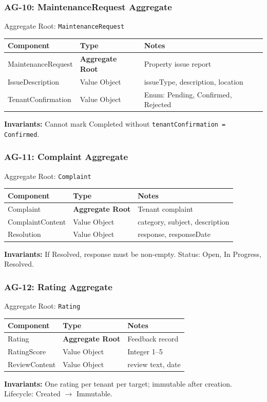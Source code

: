 \documentclass[12pt,a4paper]{article}
\begin{document}
\subsubsection{AG-10: MaintenanceRequest Aggregate}

\begin{infobox}{Aggregate Root: \texttt{MaintenanceRequest}}
\begin{tabular}{@{}p{3cm}p{2.8cm}p{7.8cm}@{}}
\textbf{Component} & \textbf{Type} & \textbf{Notes} \\
\hline
MaintenanceRequest & \textbf{Aggregate Root} & Property issue report \\
IssueDescription & Value Object & issueType, description, location \\
TenantConfirmation & Value Object & Enum: Pending, Confirmed, Rejected \\
\end{tabular}

\textbf{Invariants:} Cannot mark Completed without \texttt{tenantConfirmation = Confirmed}.
\end{infobox}

\subsubsection{AG-11: Complaint Aggregate}

\begin{infobox}{Aggregate Root: \texttt{Complaint}}
\begin{tabular}{@{}p{3cm}p{2.8cm}p{7.8cm}@{}}
\textbf{Component} & \textbf{Type} & \textbf{Notes} \\
\hline
Complaint & \textbf{Aggregate Root} & Tenant complaint \\
ComplaintContent & Value Object & category, subject, description \\
Resolution & Value Object & response, responseDate \\
\end{tabular}

\textbf{Invariants:} If Resolved, response must be non-empty. Status: Open, In Progress, Resolved.
\end{infobox}

\subsubsection{AG-12: Rating Aggregate}

\begin{infobox}{Aggregate Root: \texttt{Rating}}
\begin{tabular}{@{}p{3cm}p{2.8cm}p{7.8cm}@{}}
\textbf{Component} & \textbf{Type} & \textbf{Notes} \\
\hline
Rating & \textbf{Aggregate Root} & Feedback record \\
RatingScore & Value Object & Integer 1--5 \\
ReviewContent & Value Object & review text, date \\
\end{tabular}

\textbf{Invariants:} One rating per tenant per target; immutable after creation. Lifecycle: Created $\rightarrow$ Immutable.
\end{infobox}
\end{document}
